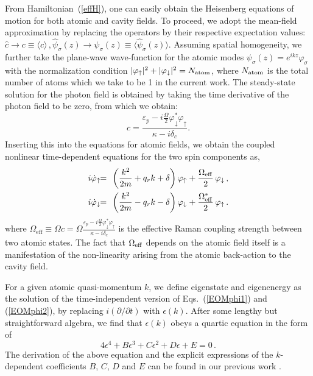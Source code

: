\documentclass[atoms,article,submit,moreauthors,pdftex,12pt,a4paper]{mdpi}
\def\ba{\begin{eqnarray}}
\def\ea{\end{eqnarray}}
\begin{document}
From Hamiltonian~(\ref{effH}), one can easily obtain the Heisenberg equations of motion for both atomic and cavity fields. To proceed, we adopt the mean-field approximation by replacing the operators by their respective expectation values: $\hat{c} \rightarrow c\equiv \langle \hat{c} \rangle \,, \hat{\psi}_\sigma ({z}) \rightarrow  \psi_\sigma (z)\equiv \langle \hat{\psi}_\sigma ({z}) \rangle $. 
Assuming spatial homogeneity, we further take the plane-wave wave-function for the atomic modes $\psi_\sigma({z})=e^{i{k} {z}}\varphi_\sigma$ with the normalization condition $|\varphi_\uparrow|^2+|\varphi_\downarrow|^2=N_{\rm atom}$, where $N_{\rm atom}$ is the total number of atoms which we take to be 1 in the current work. The steady-state solution for the photon field is obtained by taking the time derivative of the photon field to be zero, from which we obtain:
\begin{equation}
c = \frac{\varepsilon_{p}-i\frac{\Omega}{2} \varphi_\downarrow^\ast\varphi_\uparrow}{\kappa-i\delta_{c}}.
\label{c}
\end{equation}
Inserting this into the equations for atomic fields, we obtain the coupled nonlinear time-dependent equations for the two spin components as, 
\ba
i\dot{\varphi}_{\uparrow}&\!\! =\!\! & \left(\frac{{k}^{2}}{2m}+q_{r}k+\delta\right) \varphi_{\uparrow}+ \frac{\Omega_{\rm eff}}{2}\, \varphi_{\downarrow} \,,\label{EOMphi1}\\
i\dot{\varphi}_{\downarrow} & \!\!= \!\!& \left(\frac{{k}^{2}}{2m}-q_{r}k-\delta\right)\varphi_{\downarrow}+ \frac{\Omega^*_{\rm eff}}{2}\,\varphi_{\uparrow}\,.\label{EOMphi2}
\ea
where $\Omega_\text{eff} \equiv {\Omega} c ={\Omega} \frac{\varepsilon_{p}-i\frac{\Omega}{2} \varphi_\downarrow^\ast\varphi_\uparrow}{\kappa-i\delta_{c}} $ is the effective Raman coupling strength between two atomic states. The fact that $\Omega_{\rm eff}$ depends on the atomic field itself is a manifestation of the non-linearity arising from the atomic back-action to the cavity field. 

For a given atomic quasi-momentum ${k}$, we define eigenstate and eigenenergy as the solution of the time-independent version of Eqs.~(\ref{EOMphi1}) and (\ref{EOMphi2}), by replacing $i(\partial/\partial t)$ with $\epsilon({k})$. After some lengthy but straightforward algebra, we find that $\epsilon({ k})$ obeys a quartic equation in the form of
\begin{equation}
4\epsilon^4+B\epsilon^3+C\epsilon^2+D\epsilon+E=0 \,.
\label{generalquarticEq}
\end{equation}
The derivation of the above equation and the explicit expressions of the $k$-dependent coefficients $B$, $C$, $D$ and $E$ can be found in our previous work \cite{cavitySOC}. 
\end{document}
